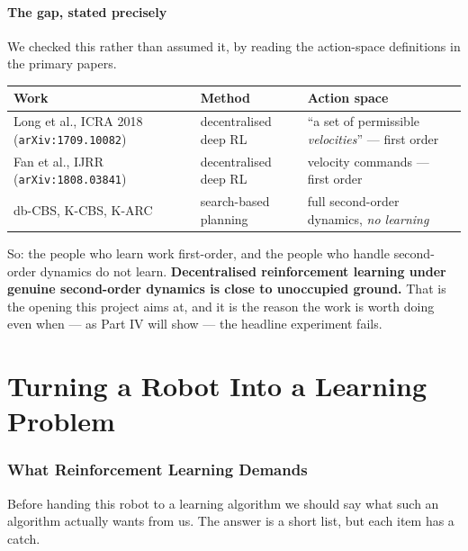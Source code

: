 \documentclass[11pt,a4paper]{article}
\newcommand{\code}[1]{\texttt{\small #1}}
\begin{document}
\subsection{The gap, stated precisely}

We checked this rather than assumed it, by reading the action-space definitions in the
primary papers.

\begin{center}
\small
\begin{tabular}{p{4.2cm}p{4.0cm}p{5.4cm}}
\toprule
\textbf{Work} & \textbf{Method} & \textbf{Action space} \\
\midrule
Long et al., ICRA 2018 \newline (\code{arXiv:1709.10082})
  & decentralised deep RL & ``a set of permissible \emph{velocities}'' --- first order \\
\addlinespace
Fan et al., IJRR \newline (\code{arXiv:1808.03841})
  & decentralised deep RL & velocity commands --- first order \\
\addlinespace
db-CBS, K-CBS, K-ARC
  & search-based planning & full second-order dynamics, \emph{no learning} \\
\bottomrule
\end{tabular}
\end{center}

So: the people who learn work first-order, and the people who handle second-order dynamics
do not learn. \textbf{Decentralised reinforcement learning under genuine second-order
dynamics is close to unoccupied ground.} That is the opening this project aims at, and it
is the reason the work is worth doing even when --- as Part IV will show --- the headline
experiment fails.
\part{Turning a Robot Into a Learning Problem}

\section{What Reinforcement Learning Demands}

Before handing this robot to a learning algorithm we should say what such an algorithm
actually wants from us. The answer is a short list, but each item has a catch.
\end{document}
